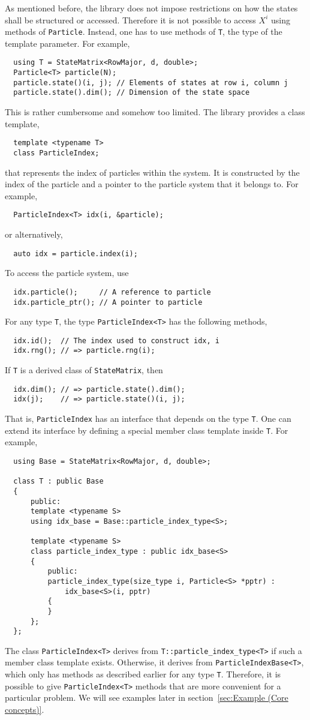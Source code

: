 As mentioned before, the library does not impose restrictions on how the states
shall be structured or accessed. Therefore it is not possible to access $X^i$
using methods of \verb|Particle|. Instead, one has to use methods of \verb|T|,
the type of the template parameter. For example,
\begin{Verbatim}
  using T = StateMatrix<RowMajor, d, double>;
  Particle<T> particle(N);
  particle.state()(i, j); // Elements of states at row i, column j
  particle.state().dim(); // Dimension of the state space
\end{Verbatim}
This is rather cumbersome and somehow too limited. The library provides a class
template,
\begin{Verbatim}
  template <typename T>
  class ParticleIndex;
\end{Verbatim}
that represents the index of particles within the system. It is constructed by
the index of the particle and a pointer to the particle system that it belongs
to. For example,
\begin{Verbatim}
  ParticleIndex<T> idx(i, &particle);
\end{Verbatim}
or alternatively,
\begin{Verbatim}
  auto idx = particle.index(i);
\end{Verbatim}
To access the particle system, use
\begin{Verbatim}
  idx.particle();     // A reference to particle
  idx.particle_ptr(); // A pointer to particle
\end{Verbatim}
For any type \verb|T|, the type \verb|ParticleIndex<T>| has the following
methods,
\begin{Verbatim}
  idx.id();  // The index used to construct idx, i
  idx.rng(); // => particle.rng(i);
\end{Verbatim}
If \verb|T| is a derived class of \verb|StateMatrix|, then
\begin{Verbatim}
  idx.dim(); // => particle.state().dim();
  idx(j);    // => particle.state()(i, j);
\end{Verbatim}
That is, \verb|ParticleIndex| has an interface that depends on the type
\verb|T|. One can extend its interface by defining a special member class
template inside \verb|T|. For example,
\begin{Verbatim}
  using Base = StateMatrix<RowMajor, d, double>;

  class T : public Base
  {
      public:
      template <typename S>
      using idx_base = Base::particle_index_type<S>;

      template <typename S>
      class particle_index_type : public idx_base<S>
      {
          public:
          particle_index_type(size_type i, Particle<S> *pptr) :
              idx_base<S>(i, pptr)
          {
          }
      };
  };
\end{Verbatim}
The class \verb|ParticleIndex<T>| derives from \verb|T::particle_index_type<T>|
if such a member class template exists. Otherwise, it derives from
\verb|ParticleIndexBase<T>|, which only has methods as described earlier for
any type \verb|T|. Therefore, it is possible to give \verb|ParticleIndex<T>|
methods that are more convenient for a particular problem. We will see examples
later in section~\ref{sec:Example (Core concepts)}.

